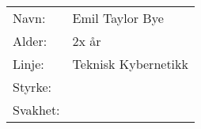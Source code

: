 \begin{table}[H]
\begin{tabular}{l l}
        Navn: & Emil Taylor Bye \\
        Alder: & 2x år \\ 
        Linje: & Teknisk Kybernetikk \\
        Styrke: & \\
        Svakhet: & 
    \end{tabular}
\end{table}
